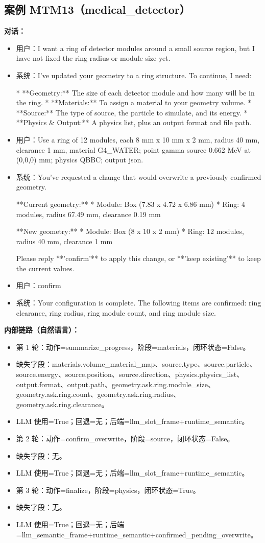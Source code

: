 \documentclass[11pt]{ctexart}
\begin{document}
\subsection{案例 MTM13（medical\_detector）}
\textbf{对话：}
\begin{itemize}
\item 用户：I want a ring of detector modules around a small source region, but I have not fixed the ring radius or module size yet.
\item 系统：I've updated your geometry to a ring structure. To continue, I need:

*   **Geometry:** The size of each detector module and how many will be in the ring.
*   **Materials:** To assign a material to your geometry volume.
*   **Source:** The type of source, the particle to simulate, and its energy.
*   **Physics \& Output:** A physics list, plus an output format and file path.
\item 用户：Use a ring of 12 modules, each 8 mm x 10 mm x 2 mm, radius 40 mm, clearance 1 mm, material G4\_WATER; point gamma source 0.662 MeV at (0,0,0) mm; physics QBBC; output json.
\item 系统：You've requested a change that would overwrite a previously confirmed geometry.

**Current geometry:**
*   Module: Box (7.83 x 4.72 x 6.86 mm)
*   Ring: 4 modules, radius 67.49 mm, clearance 0.19 mm

**New geometry:**
*   Module: Box (8 x 10 x 2 mm)
*   Ring: 12 modules, radius 40 mm, clearance 1 mm

Please reply **'confirm'** to apply this change, or **'keep existing'** to keep the current values.
\item 用户：confirm
\item 系统：Your configuration is complete. The following items are confirmed: ring clearance, ring radius, ring module count, and ring module size.
\end{itemize}
\textbf{内部链路（自然语言）：}
\begin{itemize}
\item 第 1 轮：动作=summarize\_progress，阶段=materials，闭环状态=False。
\item 缺失字段：materials.volume\_material\_map、source.type、source.particle、source.energy、source.position、source.direction、physics.physics\_list、output.format、output.path、geometry.ask.ring.module\_size、geometry.ask.ring.count、geometry.ask.ring.radius、geometry.ask.ring.clearance。
\item LLM 使用=True；回退=无；后端=llm\_slot\_frame+runtime\_semantic。
\item 第 2 轮：动作=confirm\_overwrite，阶段=source，闭环状态=False。
\item 缺失字段：无。
\item LLM 使用=True；回退=无；后端=llm\_slot\_frame+runtime\_semantic。
\item 第 3 轮：动作=finalize，阶段=physics，闭环状态=True。
\item 缺失字段：无。
\item LLM 使用=True；回退=无；后端=llm\_semantic\_frame+runtime\_semantic+confirmed\_pending\_overwrite。
\end{itemize}
\end{document}
